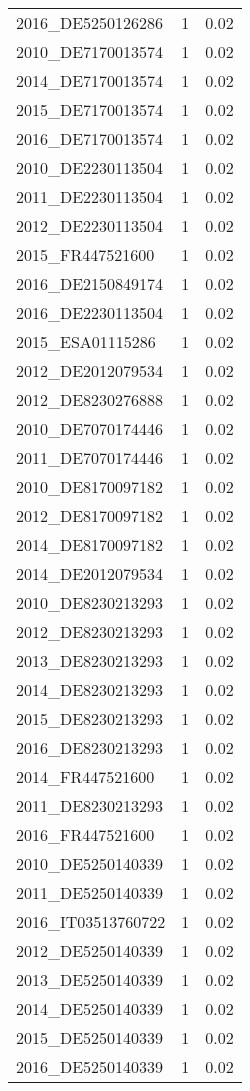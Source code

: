 \begin{table*}[htbp]
\begin{tabular}{lrr}
2016_DE5250126286 & 1 & 0.02 \\
2010_DE7170013574 & 1 & 0.02 \\
2014_DE7170013574 & 1 & 0.02 \\
2015_DE7170013574 & 1 & 0.02 \\
2016_DE7170013574 & 1 & 0.02 \\
2010_DE2230113504 & 1 & 0.02 \\
2011_DE2230113504 & 1 & 0.02 \\
2012_DE2230113504 & 1 & 0.02 \\
2015_FR447521600 & 1 & 0.02 \\
2016_DE2150849174 & 1 & 0.02 \\
2016_DE2230113504 & 1 & 0.02 \\
2015_ESA01115286 & 1 & 0.02 \\
2012_DE2012079534 & 1 & 0.02 \\
2012_DE8230276888 & 1 & 0.02 \\
2010_DE7070174446 & 1 & 0.02 \\
2011_DE7070174446 & 1 & 0.02 \\
2010_DE8170097182 & 1 & 0.02 \\
2012_DE8170097182 & 1 & 0.02 \\
2014_DE8170097182 & 1 & 0.02 \\
2014_DE2012079534 & 1 & 0.02 \\
2010_DE8230213293 & 1 & 0.02 \\
2012_DE8230213293 & 1 & 0.02 \\
2013_DE8230213293 & 1 & 0.02 \\
2014_DE8230213293 & 1 & 0.02 \\
2015_DE8230213293 & 1 & 0.02 \\
2016_DE8230213293 & 1 & 0.02 \\
2014_FR447521600 & 1 & 0.02 \\
2011_DE8230213293 & 1 & 0.02 \\
2016_FR447521600 & 1 & 0.02 \\
2010_DE5250140339 & 1 & 0.02 \\
2011_DE5250140339 & 1 & 0.02 \\
2016_IT03513760722 & 1 & 0.02 \\
2012_DE5250140339 & 1 & 0.02 \\
2013_DE5250140339 & 1 & 0.02 \\
2014_DE5250140339 & 1 & 0.02 \\
2015_DE5250140339 & 1 & 0.02 \\
2016_DE5250140339 & 1 & 0.02 \\

\end{tabular}
\end{table*}
